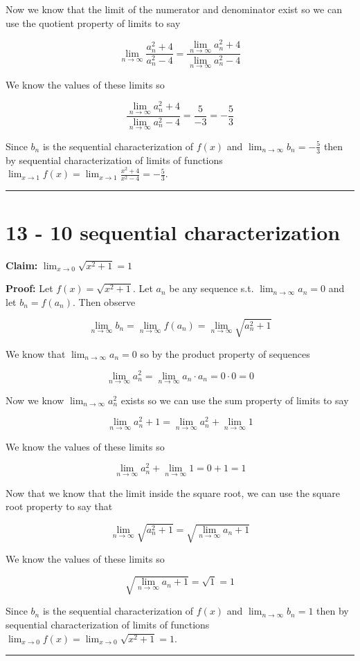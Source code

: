 \documentclass[10pt,letterpaper]{article}
\newcommand\ds{\displaystyle}
\newcommand\qedsym{\hfill \rule{2mm}{2mm}}
\begin{document}
Now we know that the limit of the numerator and denominator exist so we can use the quotient property of limits to say

\[\lim_{n\to\infty}\frac{a_n^2+4}{a_n^2-4} = \frac{\ds\lim_{n\to\infty}a_n^2+4}{\ds\lim_{n\to\infty}a_n^2-4}\]

We know the values of these limits so

\[\frac{\ds\lim_{n\to\infty}a_n^2+4}{\ds\lim_{n\to\infty}a_n^2-4} = \frac{5}{-3} = -\frac{5}{3}\]

Since $b_n$ is the sequential characterization of $f(x)$ and $\ds\lim_{n\to\infty} b_n = -\frac{5}{3}$ then by sequential characterization of limits of functions $\ds\lim_{x\to 1}f(x) = \ds\lim_{x\to 1}\frac{x^2+4}{x^2-4} = -\frac{5}{3}$.

\medskip
\qedsym

\section*{13 - 10 sequential characterization}

\textbf{Claim:} $\ds\lim_{x\to 0} \sqrt{x^2 + 1} = 1$

\medskip

\textbf{Proof:} Let $f(x) = \sqrt{x^2+1}$. Let $a_n$ be any sequence s.t. $\ds\lim_{n\to\infty}a_n = 0$ and let $b_n = f(a_n)$. Then observe

\[\lim_{n\to\infty}b_n = \lim_{n\to\infty}f(a_n) = \lim_{n\to\infty}\sqrt{a_n^2+1}\]

We know that $\ds\lim_{n\to\infty}a_n = 0$ so by the product property of sequences

\[\lim_{n\to\infty}a_n^2 = \lim_{n\to\infty}a_n\cdot a_n = 0\cdot 0 = 0\]

Now we know $\ds\lim_{n\to\infty}a_n^2$ exists so we can use the sum property of limits to say

\[\lim_{n\to\infty}a_n^2 + 1 = \lim_{n\to\infty}a_n^2 + \lim_{n\to\infty}1\]

We know the values of these limits so

\[\lim_{n\to\infty}a_n^2 + \lim_{n\to\infty}1 = 0 + 1 = 1\]

Now that we know that the limit inside the square root, we can use the square root property to say that

\[\lim_{n\to\infty}\sqrt{a_n^2 + 1} = \sqrt{\lim_{n\to\infty}a_n + 1}\]

We know the values of these limits so

\[\sqrt{\lim_{n\to\infty}a_n + 1} = \sqrt{1} = 1\]

Since $b_n$ is the sequential characterization of $f(x)$ and $\ds\lim_{n\to\infty} b_n = 1$ then by sequential characterization of limits of functions $\ds\lim_{x\to 0}f(x) = \ds\lim_{x\to 0} \sqrt{x^2 + 1} = 1$.

\qedsym
\end{document}
